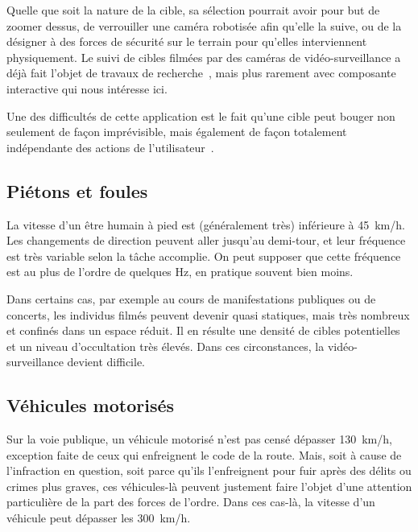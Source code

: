 	Quelle que soit la nature de la cible, sa sélection pourrait avoir pour but de zoomer dessus, de verrouiller une caméra robotisée afin qu'elle la suive, ou de la désigner à des forces de sécurité sur le terrain pour qu'elles interviennent physiquement. Le suivi de cibles filmées par des caméras de vidéo-surveillance a déjà fait l'objet de travaux de recherche~\cite{lipton1998moving, nishimura1997video, benfold2011stable}, mais plus rarement avec composante interactive qui nous intéresse ici.
	
	Une des difficultés de cette application est le fait qu'une cible peut bouger non seulement de façon imprévisible, mais également de façon totalement indépendante des actions de l'utilisateur~\cite{ilich2010moving, silva2012real}.	
	
	\FloatBarrier \subsection{Piétons et foules}
	La vitesse d'un être humain à pied est (généralement très) inférieure à 45~km/h. Les changements de direction peuvent aller jusqu'au demi-tour, et leur fréquence est très variable selon la tâche accomplie. On peut supposer que cette fréquence est au plus de l'ordre de quelques Hz, en pratique souvent bien moins.
	
	Dans certains cas, par exemple au cours de manifestations publiques ou de concerts, les individus filmés peuvent devenir quasi statiques, mais très nombreux et confinés dans un espace réduit. Il en résulte une densité de cibles potentielles et un niveau d'occultation très élevés. Dans ces circonstances, la vidéo-surveillance devient difficile.

	\FloatBarrier \subsection{Véhicules motorisés}
	Sur la voie publique, un véhicule motorisé n'est pas censé dépasser 130~km/h, exception faite de ceux qui enfreignent le code de la route. Mais, soit à cause de l'infraction en question, soit parce qu'ils l'enfreignent pour fuir après des délits ou crimes plus graves, ces véhicules-là peuvent justement faire l'objet d'une attention particulière de la part des forces de l'ordre. Dans ces cas-là, la vitesse d'un véhicule peut dépasser les 300~km/h\footnotemark.
	
	
